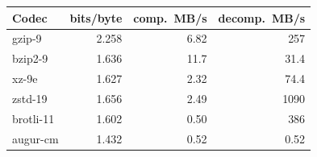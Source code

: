 \begin{tabular}{@{}lrrr@{}}
\toprule
Codec & bits/byte & comp.\ MB/s & decomp.\ MB/s \\
\midrule
gzip-9 & 2.258 & 6.82 & 257 \\
bzip2-9 & 1.636 & 11.7 & 31.4 \\
xz-9e & 1.627 & 2.32 & 74.4 \\
zstd-19 & 1.656 & 2.49 & 1090 \\
brotli-11 & 1.602 & 0.50 & 386 \\
augur-cm & 1.432 & 0.52 & 0.52 \\
\bottomrule
\end{tabular}
